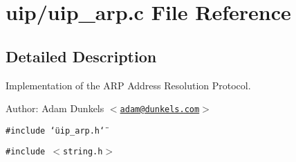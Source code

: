 \hypertarget{a00056}{
\section{uip/uip\_\-arp.c File Reference}
\label{a00056}
}


\subsection{Detailed Description}
Implementation of the ARP Address Resolution Protocol. 

\begin{Desc}
\item[Author:]Adam Dunkels $<$\href{mailto:adam@dunkels.com}{\tt adam@dunkels.com}$>$ \end{Desc}


{\tt \#include \char`\"{}uip\_\-arp.h\char`\"{}}\par
{\tt \#include $<$string.h$>$}\par


